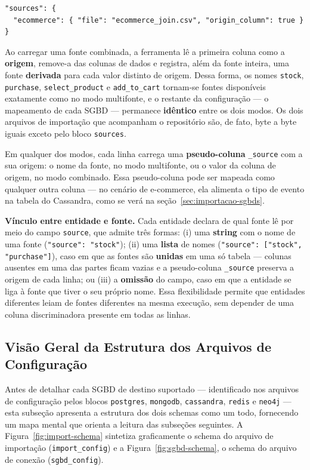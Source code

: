 \begin{lstlisting}[style=jsonstyle,caption={Bloco \texttt{sources} no modo combinado (um CSV com coluna de origem).},label={lst:sources-combined}]
"sources": {
  "ecommerce": { "file": "ecommerce_join.csv", "origin_column": true }
}
\end{lstlisting}

Ao carregar uma fonte combinada, a ferramenta lê a primeira coluna como a
\textbf{origem}, remove-a das colunas de dados e registra, além da fonte inteira, uma
fonte \textbf{derivada} para cada valor distinto de origem. Dessa forma, os nomes
\texttt{stock}, \texttt{purchase}, \texttt{select\_product} e \texttt{add\_to\_cart}
tornam-se fontes disponíveis exatamente como no modo multifonte, e o restante da
configuração --- o mapeamento de cada SGBD --- permanece \textbf{idêntico} entre os dois
modos. Os dois arquivos de importação que acompanham o repositório são, de fato, byte a
byte iguais exceto pelo bloco \texttt{sources}.

Em qualquer dos modos, cada linha carrega uma \textbf{pseudo-coluna} \texttt{\_source}
com a sua origem: o nome da fonte, no modo multifonte, ou o valor da coluna de origem, no
modo combinado. Essa pseudo-coluna pode ser mapeada como qualquer outra coluna --- no
cenário de e-commerce, ela alimenta o tipo de evento na tabela do Cassandra, como se verá
na seção~\ref{sec:importacao-sgbds}.

\textbf{Vínculo entre entidade e fonte.} Cada entidade declara de qual fonte lê por meio
do campo \texttt{source}, que admite três formas: (i) uma \textbf{string} com o nome de
uma fonte (\texttt{"source": "stock"}); (ii) uma \textbf{lista} de nomes
(\texttt{"source": ["stock", "purchase"]}), caso em que as fontes são \textbf{unidas} em
uma só tabela --- colunas ausentes em uma das partes ficam vazias e a pseudo-coluna
\texttt{\_source} preserva a origem de cada linha; ou (iii) a \textbf{omissão} do campo,
caso em que a entidade se liga à fonte que tiver o seu próprio nome. Essa flexibilidade
permite que entidades diferentes leiam de fontes diferentes na mesma execução, sem
depender de uma coluna discriminadora presente em todas as linhas.

\subsection{Visão Geral da Estrutura dos Arquivos de Configuração}
\label{sec:visao-schema}

Antes de detalhar cada SGBD de destino suportado --- identificado nos arquivos de
configuração pelos blocos \texttt{postgres}, \texttt{mongodb},
\texttt{cassandra}, \texttt{redis} e \texttt{neo4j} --- esta subseção apresenta a
estrutura dos dois schemas como um todo, fornecendo um mapa mental que orienta a
leitura das subseções seguintes. A Figura~\ref{fig:import-schema} sintetiza
graficamente o schema do arquivo de importação (\texttt{import\_config}) e a
Figura~\ref{fig:sgbd-schema}, o schema do arquivo de conexão (\texttt{sgbd\_config}).

